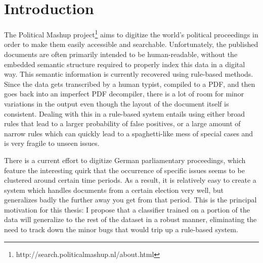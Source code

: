 \section*{Introduction}
The Political Mashup
project\footnote{http://search.politicalmashup.nl/about.html} aims to digitize
the world's political proceedings in order to make them easily accessible and
searchable. Unfortunately, the published documents are often primarily intended
to be human-readable, without the embedded semantic structure required to
properly index this data in a digital way. This semantic information is
currently recovered using rule-based methods. Since the data gets transcribed by
a human typist, compiled to a PDF, and then goes back into an imperfect PDF
decompiler, there is a lot of room for minor variations in the output even
though the layout of the document itself is consistent. Dealing with this in a
rule-based system entails using either broad rules that lead to a larger
probability of false positives, or a large amount of narrow rules which can
quickly lead to a spaghetti-like mess of special cases and is very fragile to
unseen issues.

There is a current effort to digitize German parliamentary proceedings, which
feature the interesting quirk that the occurrence of specific issues seems to be
clustered around certain time periods. As a result, it is relatively easy to
create a system which handles documents from a certain election very well, but
generalizes badly the further away you get from that period. This is the
principal motivation for this thesis: I propose that a classifier trained on a
portion of the data will generalize to the rest of the dataset in a robust
manner, eliminating the need to track down the minor bugs that would trip up a
rule-based system.
